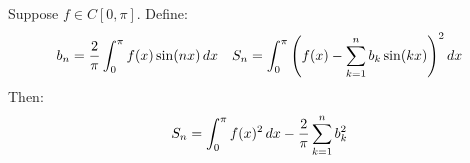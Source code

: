 \documentclass[main.tex]{subfiles}
\begin{document}
\begin{lemma}
    Suppose $f\in C[0,\pi]$. Define:
    \begin{align*}
        b_n = \frac{2}{\pi}\int_0^\pi f(x)\sin(nx)\,dx
        &&
        S_n = \int_0^\pi \qty(f(x)-\sum_{k=1}^n b_k\sin(kx))^2\,dx
    \end{align*}
    Then:
    \begin{equation*}
        S_n = \int_0^\pi f(x)^2\,dx - \frac{2}{\pi}\sum_{k=1}^n b_k^2
    \end{equation*}
\end{lemma}
\end{document}
